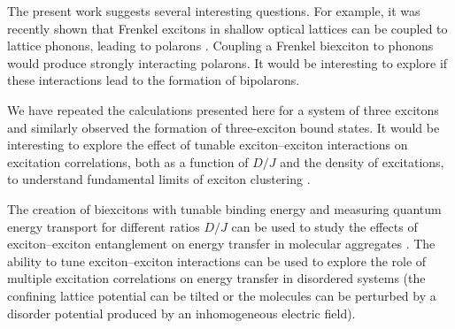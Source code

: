 The present work suggests several interesting questions. For example, it was recently shown that Frenkel excitons in
 shallow optical lattices can be coupled to lattice phonons, leading to polarons \cite{felipe-polarons}. Coupling a
 Frenkel biexciton to phonons would produce strongly interacting polarons. It would be interesting to explore if these
 interactions lead to the formation of bipolarons. 



We have repeated the calculations presented here for a system of three excitons and similarly observed the formation
 of three-exciton bound states. It would be interesting to explore the effect of tunable exciton--exciton interactions
 on excitation correlations, both as a function of $D/J$ and the density of excitations, to understand fundamental
 limits of exciton clustering \cite{exciton-cluster}. 


The creation of biexcitons with tunable binding energy and measuring quantum energy transport for different ratios
 $D/J$ can be used to study the effects of exciton--exciton entanglement on energy transfer in molecular aggregates
 \cite{photosynthesis-1,photosynthesis-2,photosynthesis-3}. The ability to tune exciton--exciton interactions can be
 used to explore the role of multiple excitation correlations on energy transfer in disordered systems (the confining
 lattice potential can be tilted or the molecules can be perturbed by a disorder potential produced by an
 inhomogeneous electric field).
  



